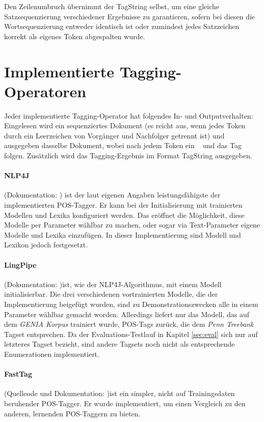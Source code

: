 Den Zeilenumbruch übernimmt der TagString selbst, um eine gleiche Satzsequenzierung verschiedener Ergebnisse zu garantieren, sofern bei diesen die Wortsequenzierung entweder identisch ist oder zumindest jedes Satzzeichen korrekt als eigenes Token abgespalten wurde.

\section{Implementierte Tagging-Operatoren}
Jeder implementierte Tagging-Operator hat folgendes In- und Outputverhalten: Eingelesen wird ein sequenziertes Dokument (es reicht aus, wenn jedes Token durch ein Leerzeichen von Vorgänger und Nachfolger getrennt ist) und ausgegeben dasselbe Dokument, wobei nach jedem Token ein \glqq \ \grqq{} und das Tag folgen. Zusätzlich wird das Tagging-Ergebnis im Format TagString ausgegeben.

\paragraph{NLP4J}
(Dokumentation: \cite{choi}) ist der laut eigenen Angaben leistungsfähigste der implementierten POS-Tagger. Er kann bei der Initialisierung mit trainierten Modellen und Lexika konfiguriert werden. Das eröffnet die Möglichkeit, diese Modelle per Parameter wählbar zu machen, oder sogar via Text-Parameter eigene Modelle und Lexika einzufügen. In dieser Implementierung sind Modell und Lexikon jedoch festgesetzt.
\paragraph{LingPipe}
(Dokumentation: \cite{Lingpipedoc})ist, wie der NLP4J-Algorithmus, mit einem Modell initialisierbar. Die drei verschiedenen vortrainierten Modelle, die der Implementierung beigefügt wurden, sind zu Demonstrationszwecken alle in einem Parameter wählbar gemacht worden. Allerdings liefert nur das Modell, das auf dem \textit{GENIA Korpus} \cite{GENIA} trainiert wurde, POS-Tags zurück, die dem \textit{Penn Treebank} Tagset entsprechen. Da der Evaluations-Testlauf in Kapitel \ref{sec:eval} sich nur auf letzteres Tagset bezieht, sind andere Tagsets noch nicht als entsprechende Enumerationen implementiert.
\paragraph{FastTag}
(Quellcode und Dokumentation: \cite{fasttagdoc})ist ein simpler, nicht auf Trainingsdaten beruhender POS-Tagger. Er wurde implementiert, um einen Vergleich zu den anderen, lernenden POS-Taggern zu bieten.




